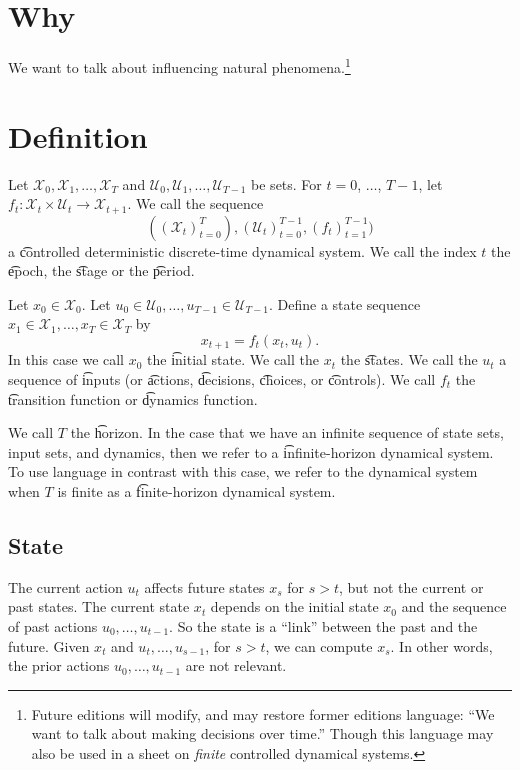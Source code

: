 

\section*{Why}

We want to talk about influencing natural phenomena.\footnote{Future editions will modify, and may restore former editions language: ``We want to talk about making decisions over time.''
Though this language may also be used in a sheet on \textit{finite} controlled dynamical systems.}

\section*{Definition}

Let $\mathcal{X} _0, \mathcal{X} _1, \dots , \mathcal{X} _{T}$ and $\mathcal{U} _0, \mathcal{U} _1, \dots , \mathcal{U} _{T-1}$ be sets.
For $t = 0$, $\dots $, $T-1$, let $f_{t}: \mathcal{X} _t \times \mathcal{U} _t \to \mathcal{X} _{t+1}$.
We call the sequence
\[
((\mathcal{X} _t)_{t = 0}^{T}), (\mathcal{U} _t)_{t=0}^{T-1}, (f_t)_{t=1}^{T-1})
\]
a \t{controlled deterministic discrete-time dynamical system}.
We call the index $t$ the \t{epoch}, the \t{stage} or the \t{period}.

Let $x_0 \in \mathcal{X} _0$.
Let $u_0 \in \mathcal{U} _0, \dots , u_{T-1} \in \mathcal{U} _{T-1}$. Define a state sequence $x_1 \in \mathcal{X} _1, \dots , x_T \in \mathcal{X} _T$ by
\[
x_{t+1} = f_t(x_t, u_t).
\]
In this case we call $x_0$ the \t{initial state}.
We call the $x_t$ the \t{states}.
We call the $u_t$ a sequence of \t{inputs} (or \t{actions}, \t{decisions}, \t{choices}, or \t{controls}).
We call $f_t$ the \t{transition function} or \t{dynamics function}.

We call $T$ the \t{horizon}.
In the case that we have an infinite sequence of state sets, input sets, and dynamics, then we refer to a \t{infinite-horizon} dynamical system.
To use language in contrast with this case, we refer to the dynamical system when $T$ is finite as a \t{finite-horizon} dynamical system.

\subsection*{State}

The current action $u_t$ affects future states $x_{s}$ for $s > t$, but not the current or past states.
The current state $x_t$ depends on the initial state $x_0$ and the sequence of past actions $u_0, \dots , u_{t-1}$.
So the state is a ``link'' between the past and the future.
Given $x_t$ and $u_t, \dots , u_{s-1}$, for $s > t$, we can compute $x_s$.
In other words, the prior actions $u_0, \dots , u_{t-1}$ are not relevant.

